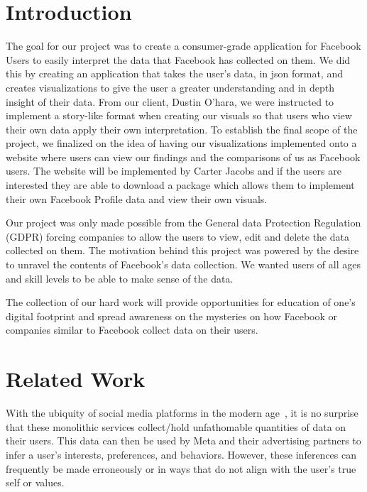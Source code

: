 \documentclass[conference, letterpaper, 11pt]{IEEEtran}
\begin{document}
\section{Introduction} \label{IN}

The goal for our project was to create a consumer-grade application for Facebook Users to easily interpret the data that Facebook has collected on them. We did this by creating an application that takes the user’s data, in json format, and creates visualizations to give the user a greater understanding and in depth insight of their data. From our client, Dustin O’hara, we were instructed to implement a story-like format when creating our visuals so that users who view their own data apply their own interpretation. To establish the final scope of the project, we finalized on the idea of having our visualizations implemented onto a website where users can view our findings and the comparisons of us as Facebook users. The website will be implemented by Carter Jacobs and if the users are interested they are able to download a package which allows them to implement their own Facebook Profile data and view their own visuals. 

Our project was only made possible from the General data Protection Regulation (GDPR) forcing companies to allow the users to view, edit and delete the data collected on them. The motivation behind this project was powered by the desire to unravel the contents of Facebook’s data collection. We wanted users of all ages and skill levels to be able to make sense of the data. 

The collection of our hard work will provide opportunities for education of one's digital footprint and spread awareness on the mysteries on how Facebook or companies similar to Facebook collect data on their users. 

\section{Related Work} \label{RW}

With the ubiquity of social media platforms in the modern age~\cite{metapress}, it is no surprise that these monolithic services collect/hold unfathomable quantities of data on their users. This data can then be used by Meta and their advertising partners to infer a user's interests, preferences, and behaviors. However, these inferences can frequently be made erroneously or in ways that do not align with the user's true self or values.
\end{document}
